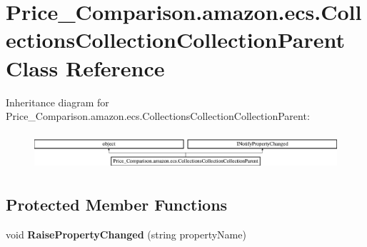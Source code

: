 \hypertarget{class_price___comparison_1_1amazon_1_1ecs_1_1_collections_collection_collection_parent}{\section{Price\-\_\-\-Comparison.\-amazon.\-ecs.\-Collections\-Collection\-Collection\-Parent Class Reference}
\label{class_price___comparison_1_1amazon_1_1ecs_1_1_collections_collection_collection_parent}
}


 


Inheritance diagram for Price\-\_\-\-Comparison.\-amazon.\-ecs.\-Collections\-Collection\-Collection\-Parent\-:\begin{figure}[H]
\begin{center}
\leavevmode
\includegraphics[height=1.365854cm]{class_price___comparison_1_1amazon_1_1ecs_1_1_collections_collection_collection_parent}
\end{center}
\end{figure}
\subsection*{Protected Member Functions}
\begin{DoxyCompactItemize}
\item 
\hypertarget{class_price___comparison_1_1amazon_1_1ecs_1_1_collections_collection_collection_parent_aeb1b1984b33bd20882ec36733f6d70aa}{void {\bfseries Raise\-Property\-Changed} (string property\-Name)}\label{class_price___comparison_1_1amazon_1_1ecs_1_1_collections_collection_collection_parent_aeb1b1984b33bd20882ec36733f6d70aa}

\end{DoxyCompactItemize}
